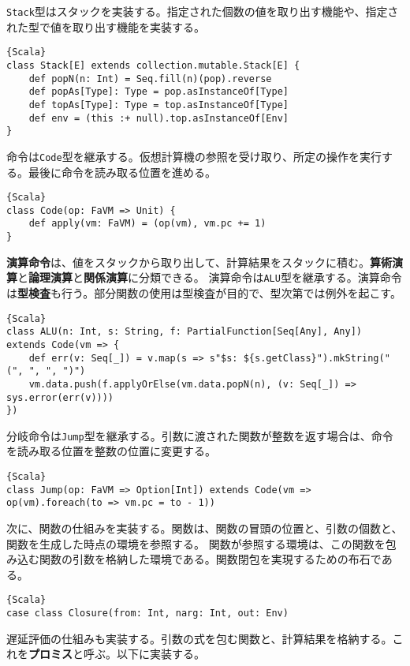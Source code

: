 \documentclass[10pt,a4paper]{book}
\begin{document}
\texttt{Stack}型はスタックを実装する。指定された個数の値を取り出す機能や、指定された型で値を取り出す機能を実装する。

\begin{Verbatim}{Scala}
class Stack[E] extends collection.mutable.Stack[E] {
	def popN(n: Int) = Seq.fill(n)(pop).reverse
	def popAs[Type]: Type = pop.asInstanceOf[Type]
	def topAs[Type]: Type = top.asInstanceOf[Type]
	def env = (this :+ null).top.asInstanceOf[Env]
}
\end{Verbatim}

命令は\texttt{Code}型を継承する。仮想計算機の参照を受け取り、所定の操作を実行する。最後に命令を読み取る位置を進める。

\begin{Verbatim}{Scala}
class Code(op: FaVM => Unit) {
	def apply(vm: FaVM) = (op(vm), vm.pc += 1)
}
\end{Verbatim}

\textbf{演算命令}は、値をスタックから取り出して、計算結果をスタックに積む。\textbf{算術演算}と\textbf{論理演算}と\textbf{関係演算}に分類できる。
演算命令は\texttt{ALU}型を継承する。演算命令は\textbf{型検査}も行う。部分関数の使用は型検査が目的で、型次第では例外を起こす。

\begin{Verbatim}{Scala}
class ALU(n: Int, s: String, f: PartialFunction[Seq[Any], Any]) extends Code(vm => {
	def err(v: Seq[_]) = v.map(s => s"$s: ${s.getClass}").mkString("(", ", ", ")")
	vm.data.push(f.applyOrElse(vm.data.popN(n), (v: Seq[_]) => sys.error(err(v))))
})
\end{Verbatim}

分岐命令は\texttt{Jump}型を継承する。引数に渡された関数が整数を返す場合は、命令を読み取る位置を整数の位置に変更する。

\begin{Verbatim}{Scala}
class Jump(op: FaVM => Option[Int]) extends Code(vm => op(vm).foreach(to => vm.pc = to - 1))
\end{Verbatim}

次に、関数の仕組みを実装する。関数は、関数の冒頭の位置と、引数の個数と、関数を生成した時点の環境を参照する。
関数が参照する環境は、この関数を包み込む関数の引数を格納した環境である。関数閉包を実現するための布石である。

\begin{Verbatim}{Scala}
case class Closure(from: Int, narg: Int, out: Env)
\end{Verbatim}

遅延評価の仕組みも実装する。引数の式を包む関数と、計算結果を格納する。これを\textbf{プロミス}と呼ぶ。以下に実装する。
\end{document}

